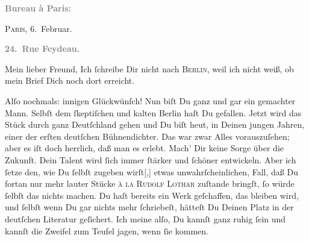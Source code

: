 \pstart
           \begin{otherlanguage}{french}\textcolor{gray}{\textbf{\textbf{Bureau à Paris:}}}\end{otherlanguage}\hfill \textsc{Paris}, 6. Februar.\pend
           
\pstart
           \begin{otherlanguage}{french}\textcolor{gray}{\textbf{\textbf{24. Rue Feydeau.}}}\end{otherlanguage}\pend
           
\pstart\center{}Mein lieber Freund,\pend\vspace{0.5em}
\pstart
           Ich ſchreibe Dir nicht nach \textsc{Berlin}, weil ich nicht weiß, ob mein Brief Dich noch dort erreicht.\pend
           
\pstart
           Alſo nochmals: innigen Glückwünſch! Nun biſt Du ganz und gar ein gemachter Mann.
               Selbſt dem ſkeptiſchen und kalten Berlin haſt Du
               gefallen. Jetzt wird das Stück
               durch ganz Deutſchland gehen\strikeout{,} und Du biſt heut, in Deinen jungen Jahren, einer der
               erſten deutſchen Bühnendichter. {\pb}Das war zwar Alles
               vorauszuſehen; aber es iſt doch herrlich, daß man es  erleb\strikeout{\textcolor{gray}{e}}t. Mach’ Dir keine Sorge über die Zukunft. Dein Talent wird ſich immer ſtärker
               und ſchöner entwickeln. Aber ich ſetze den, wie Du ſelbſt zugeben
                  wirſt{[},{]} etwas unwahrſcheinlichen, Fall, daß  Du fortan nur mehr lauter Stücke \textsc{à la}{ }\textsc{Rudolf Lothar} zuſtande bringſt, ſo würde ſelbſt das nichts machen. Du haſt bereits ein Werk
               geſchaffen, das {\pb}bleiben wird, und ſelbſt wenn Du
               gar nichts mehr ſchriebeſt, hätteſt Du Deinen Platz in der deutſchen Literatur
               geſichert. Ich meine alſo, Du kannſt ganz ruhig ſein\strikeout{,}
               und kannſt die Zweifel zum Teufel jagen, wenn ſie kommen.\pend
           
